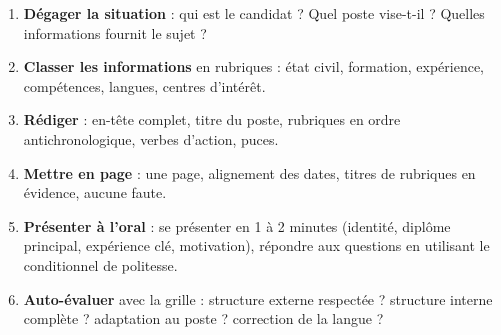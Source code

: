 \documentclass[11pt]{article}
\begin{document}
\begin{methode}
\begin{enumerate}
\item \textbf{Dégager la situation} : qui est le candidat ? Quel poste vise-t-il ? Quelles informations fournit le sujet ?
\item \textbf{Classer les informations} en rubriques : état civil, formation, expérience, compétences, langues, centres d'intérêt.
\item \textbf{Rédiger} : en-tête complet, titre du poste, rubriques en ordre antichronologique, verbes d'action, puces.
\item \textbf{Mettre en page} : une page, alignement des dates, titres de rubriques en évidence, aucune faute.
\item \textbf{Présenter à l'oral} : se présenter en 1 à 2 minutes (identité, diplôme principal, expérience clé, motivation), répondre aux questions en utilisant le conditionnel de politesse.
\item \textbf{Auto-évaluer} avec la grille : structure externe respectée ? structure interne complète ? adaptation au poste ? correction de la langue ?
\end{enumerate}
\end{methode}
\end{document}
